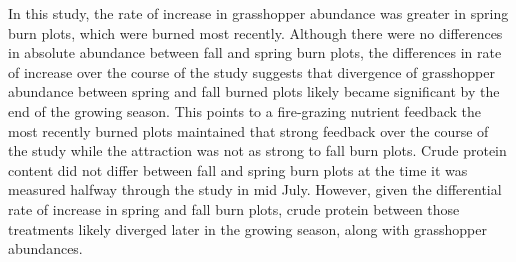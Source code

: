 \documentclass[referee, 
	            sn-basic]
           {sn-jnl}
\begin{document}
\begin{linenumbers}
In this study, the rate of increase in grasshopper abundance was greater in spring burn plots, which were burned most recently. Although there were no differences in absolute abundance between fall and spring burn plots, the differences in rate of increase over the course of the study suggests that divergence of grasshopper abundance between spring and fall burned plots likely became significant by the end of the growing season. This points to a fire-grazing nutrient feedback \textemdash the most recently burned plots maintained that strong feedback over the course of the study while the attraction was not as strong to fall burn plots. Crude protein content did not differ between fall and spring burn plots at the time it was measured \textemdash halfway through the study in mid July. However, given the differential rate of increase in spring and fall burn plots, crude protein between those treatments likely diverged later in the growing season, along with grasshopper abundances. 



\end{linenumbers}
\end{document}

